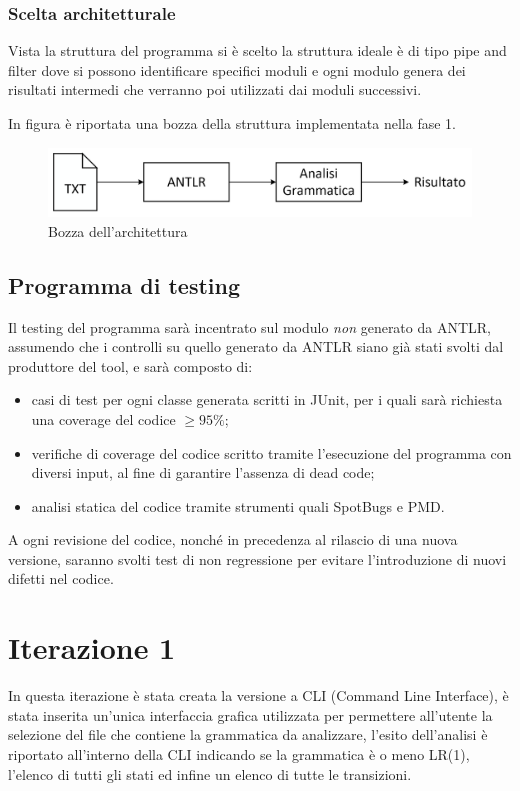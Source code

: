 \documentclass[12pt]{article}
\begin{document}
\subsubsection{Scelta architetturale}\label{bozzaArc}
Vista la struttura del programma si è scelto la struttura ideale è di tipo pipe and filter dove si possono identificare specifici moduli e ogni modulo genera dei risultati intermedi che verranno poi utilizzati dai moduli successivi.\par
In figura è riportata una bozza della struttura implementata nella fase 1.
\par

\begin{figure}[h]
\centering
\includegraphics[scale=0.8]{immagini/bozzaArchitettura_v0.png}
\caption{Bozza dell'architettura}
\end{figure}

\pagebreak

\subsection{Programma di testing}
Il testing del programma sarà incentrato sul modulo \textit{non} generato da ANTLR, assumendo che i controlli su quello generato da ANTLR siano già stati svolti dal produttore del tool, e sarà composto di:
\begin{itemize}
\item casi di test per ogni classe generata scritti in JUnit, per i quali sarà richiesta una coverage del codice $\geq 95\%$;
\item verifiche di coverage del codice scritto tramite l'esecuzione del programma con diversi input, al fine di garantire l'assenza di dead code;
\item analisi statica del codice tramite strumenti quali SpotBugs e PMD.
\end{itemize}
A ogni revisione del codice, nonché in precedenza al rilascio di una nuova versione, saranno svolti test di non regressione per evitare l'introduzione di nuovi difetti nel codice.
\pagebreak

\section{Iterazione 1}
In questa iterazione è stata creata la versione a CLI (Command Line Interface), è stata inserita un'unica interfaccia grafica utilizzata per permettere all'utente la selezione del file che contiene la grammatica da analizzare, l'esito dell'analisi è riportato all'interno della CLI indicando se la grammatica è o meno LR(1), l'elenco di tutti gli stati ed infine un elenco di tutte le transizioni.
\end{document}
